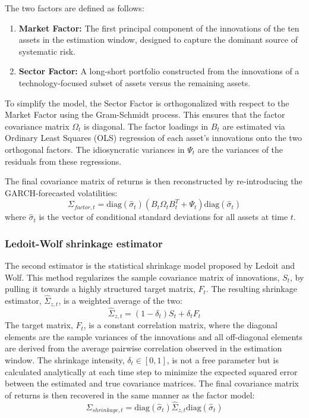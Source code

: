 \documentclass[]{article}
\begin{document}
The two factors are defined as follows:
\begin{enumerate}
    \item \textbf{Market Factor:} The first principal component of the innovations of the ten assets in the estimation window, designed to capture the dominant source of systematic risk.
    \item \textbf{Sector Factor:} A long-short portfolio constructed from the innovations of a technology-focused subset of assets versus the remaining assets.
\end{enumerate}
To simplify the model, the Sector Factor is orthogonalized with respect to the Market Factor using the Gram-Schmidt process. This ensures that the factor covariance matrix $\Omega_t$ is diagonal. The factor loadings in $B_t$ are estimated via Ordinary Least Squares (OLS) regression of each asset's innovations onto the two orthogonal factors. The idiosyncratic variances in $\Psi_t$ are the variances of the residuals from these regressions.

The final covariance matrix of returns is then reconstructed by re-introducing the GARCH-forecasted volatilities:
\begin{equation}
\Sigma_{factor, t} = \text{diag}(\hat{\sigma}_t) (B_t \Omega_t B_t^T + \Psi_t) \text{diag}(\hat{\sigma}_t)
\end{equation}
where $\hat{\sigma}_t$ is the vector of conditional standard deviations for all assets at time $t$.

\subsubsection{Ledoit-Wolf shrinkage estimator}
The second estimator is the statistical shrinkage model proposed by Ledoit and Wolf. This method regularizes the sample covariance matrix of innovations, $S_t$, by pulling it towards a highly structured target matrix, $F_t$. The resulting shrinkage estimator, $\hat{\Sigma}_{z,t}$, is a weighted average of the two:
\begin{equation}
\hat{\Sigma}_{z,t} = (1-\delta_t)S_t + \delta_t F_t
\end{equation}
The target matrix, $F_t$, is a constant correlation matrix, where the diagonal elements are the sample variances of the innovations and all off-diagonal elements are derived from the average pairwise correlation observed in the estimation window. The shrinkage intensity, $\delta_t \in [0, 1]$, is not a free parameter but is calculated analytically at each time step to minimize the expected squared error between the estimated and true covariance matrices. The final covariance matrix of returns is then recovered in the same manner as the factor model:
\begin{equation}
\Sigma_{shrinkage, t} = \text{diag}(\hat{\sigma}_t) \hat{\Sigma}_{z,t} \text{diag}(\hat{\sigma}_t)
\end{equation}
\end{document}

